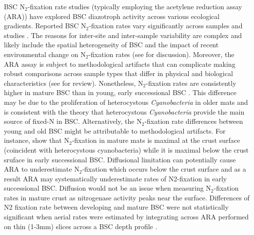 BSC N$_{2}$-fixation rate studies (typically employing the acetylene reduction assay
(ARA)) have explored BSC diazotroph activity across various ecological
gradients. Reported BSC N$_{2}$-fixation rates vary significantly across samples
and studies \citep{Evans_2001}.  The reasons for inter-site and inter-sample
variability are complex and likely include the spatial heterogeneity of BSC
\citep{Evans_2001} and the impact of recent environmental change on
N$_{2}$-fixation rates (see \citet{Belnap_2001} for discussion).  Moreover, the ARA
assay is subject to methodological artifacts that can complicate making robust
comparisons across sample types that differ in physical and biological
characteristics (see \citet{Belnap_2001} for review). Nonetheless,
N$_{2}$-fixation rates are consistently higher in mature BSC than in young,
early successional BSC \citep{Belnap_2002, 14766579}. This difference may be
due to the proliferation of heterocystous \textit{Cyanobacteria} in older mats
and is consistent with the theory that heterocystous \textit{Cyanobacteria} 
provide the main source of fixed-N in BSC. Alternatively, the N$_{2}$-fixation rate
differences between young and old BSC might be attributable to methodological
artifacts.  For instance, \citet{15643930} show that N$_{2}$-fixation in mature
mats is maximal at the crust surface (coincident with heterocystous
cyanobacteria) while it is maximal below the crust sruface in early
successional BSC.  Diffusional limitation can potentially cause ARA to
underestimate N$_{2}$-fixation which occurs below the crust surface and as a
result ARA may systematically underestimate rates of N2-fixation in early
successional BSC.  Diffusion would not be an issue when measuring
N$_{2}$-fixation rates in mature crust as nitrogenase activity peaks near the
surface.  Differences of N2 fixation rate between developing and mature BSC
were not statistically significant when aerial rates were estimated by
integrating across ARA performed on thin (1-3mm) slices across a BSC depth
profile \citet{15643930}.

